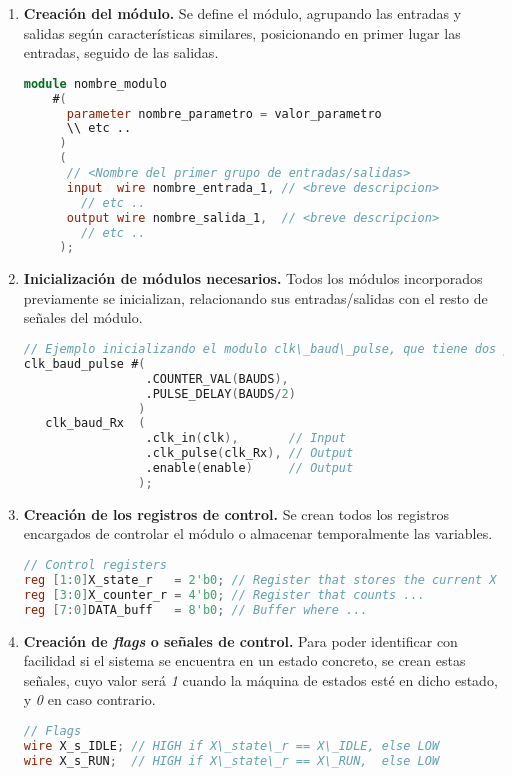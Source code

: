 \begin{enumerate}
    \item{\textbf{Creación del módulo.}} Se define el módulo, agrupando las entradas y salidas según características similares, posicionando en primer lugar las entradas, seguido de las salidas.
    \begin{lstlisting}[language=Verilog,
        caption={Ejemplo de creación de módulo.},
        label=src:procedimientos-verilog-create]
module nombre_modulo
    #(
      parameter nombre_parametro = valor_parametro
      \\ etc ..
     )
     (
      // <Nombre del primer grupo de entradas/salidas>
      input  wire nombre_entrada_1, // <breve descripcion>
        // etc ..
      output wire nombre_salida_1,  // <breve descripcion>
        // etc ..
     );
    \end{lstlisting}
    
    \item{\textbf{Inicialización de módulos necesarios.}} Todos los módulos incorporados previamente se inicializan, relacionando sus entradas/salidas con el resto de señales del módulo.
    \begin{lstlisting}[language=Verilog,
        caption={Ejemplo inicialización de módulos.},
        label=src:procedimientos-verilog-mod-init]
// Ejemplo inicializando el modulo clk\_baud\_pulse, que tiene dos parametros, una entrada y dos salidas
clk_baud_pulse #(
                 .COUNTER_VAL(BAUDS),
                 .PULSE_DELAY(BAUDS/2)
                )
   clk_baud_Rx  (
                 .clk_in(clk),       // Input
                 .clk_pulse(clk_Rx), // Output
                 .enable(enable)     // Output
                );
    \end{lstlisting}
    
    \item{\textbf{Creación de los registros de control.}} Se crean todos los registros encargados de controlar el módulo o almacenar temporalmente las variables.
    \begin{lstlisting}[language=Verilog,
        caption={Ejemplo de creación de registros.},
        label=src:procedimientos-verilog-regs]
// Control registers
reg [1:0]X_state_r   = 2'b0; // Register that stores the current X state
reg [3:0]X_counter_r = 4'b0; // Register that counts ...
reg [7:0]DATA_buff   = 8'b0; // Buffer where ...
    \end{lstlisting}

    \item{\textbf{Creación de \textit{flags} o señales de control.}} Para poder identificar con facilidad si el sistema se encuentra en un estado concreto, se crean estas señales, cuyo valor será \textit{1} cuando la máquina de estados esté en dicho estado, y \textit{0} en caso contrario.
    \begin{lstlisting}[language=Verilog,
        caption={Ejemplo de creación de \textit{flags}.},
        label=src:procedimientos-verilog-flags]
// Flags
wire X_s_IDLE; // HIGH if X\_state\_r == X\_IDLE, else LOW
wire X_s_RUN;  // HIGH if X\_state\_r == X\_RUN,  else LOW
    \end{lstlisting}


\end{enumerate}
